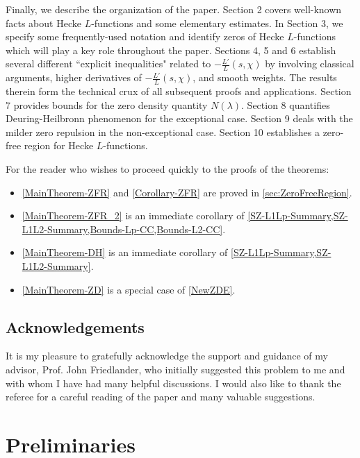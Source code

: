 \documentclass[12pt,psamsfonts]{amsart}
\DeclareRobustCommand{\SkipTocEntry}[5]{}
\theoremstyle{definition}
\theoremstyle{remark}
\numberwithin{equation}{section}
\newcounter{notation}
\begin{document}
Finally, we describe the organization of the paper. Section 2 covers well-known facts about Hecke $L$-functions and some elementary estimates. In Section 3, we specify some frequently-used notation and identify zeros of Hecke $L$-functions which will play a key role throughout the paper. Sections 4, 5 and 6 establish several different ``explicit inequalities" related to $-\tfrac{L'}{L}(s,\chi)$ by involving classical arguments, higher derivatives of $-\tfrac{L'}{L}(s,\chi)$, and smooth weights. The results therein form the technical crux of all subsequent proofs and applications. Section 7 provides bounds for the zero density quantity $N(\lambda)$. Section 8 quantifies Deuring-Heilbronn phenomenon for the exceptional case. Section 9 deals with the milder zero repulsion in the non-exceptional case. Section 10 establishes a zero-free region for Hecke $L$-functions.

For the reader who wishes to proceed quickly to the proofs of the theorems:

\begin{itemize}
	\item \cref{MainTheorem-ZFR} and \cref{Corollary-ZFR} are proved in \cref{sec:ZeroFreeRegion}. 
	\item \cref{MainTheorem-ZFR_2} is an immediate corollary of \cref{SZ-L1Lp-Summary,SZ-L1L2-Summary,Bounds-Lp-CC,Bounds-L2-CC}.
	\item \cref{MainTheorem-DH} is an immediate corollary of \cref{SZ-L1Lp-Summary,SZ-L1L2-Summary}. 
	\item \cref{MainTheorem-ZD} is a special case of \cref{NewZDE}. 
\end{itemize}

\subsection*{Acknowledgements} 
\noindent
It is my pleasure to gratefully acknowledge the support and guidance of my advisor, Prof. John Friedlander, who initially suggested this problem to me and with whom I have had many helpful discussions. I would also like to thank the referee for a careful reading of the paper and many valuable suggestions. 


\section{Preliminaries}
\label{sec:Preliminaries}
\end{document}
